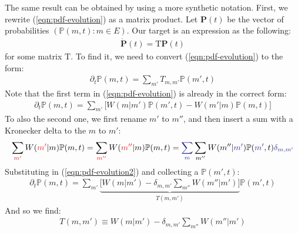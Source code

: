 \documentclass[../../main.tex]{subfiles}
\begin{document}
\medskip

The same result can be obtained by using a more synthetic notation. First, we rewrite (\ref{eqn:pdf-evolution}) as a matrix product. Let $\bm{P}(t)$ be the vector of probabilities $(\mathbb{P}(m,t)\colon m \in E)$. Our target is an expression as the following:
\begin{align}\label{eqn:pdf-evolution-matrixform}
    \dot{\bm{P}}(t) = \mathrm{T} \bm{P}(t)
\end{align}
for some matrix $\mathrm{T}$. To find it, we need to convert (\ref{eqn:pdf-evolution}) to the form:
\begin{align*}
    \partial_t \mathbb{P}(m,t) = \sum_{m'} T_{m,m'} \mathbb{P}(m',t)
\end{align*}
Note that the first term in (\ref{eqn:pdf-evolution}) is already in the correct form:
\begin{align}\label{eqn:pdf-evolution2}
    \partial_t \mathbb{P}(m,t) = \sum_{m'} \Big[W(m|m') \mathbb{P}(m',t) - W(m'|m)\mathbb{P}(m,t)\Big]
\end{align}
To  also the second one, we first rename $m'$ to $m''$, and then insert a sum with a Kronecker delta to  the $m$ to $m'$:
\begin{align*}
    \sum_{\textcolor{Red}{m'}} W(\textcolor{Red}{m'}|m) \mathbb{P}(m,t) = \sum_{\textcolor{Red}{m''}} W(\textcolor{Red}{m''}|m) \mathbb{P}(m,t) = \textcolor{Blue}{\sum_{m}} \sum_{m''} W(m''|\textcolor{Blue}{m'}) \mathbb{P}(\textcolor{Blue}{m'},t) \textcolor{Blue}{\delta_{m,m'}}
\end{align*}
Substituting in (\ref{eqn:pdf-evolution2}) and collecting a $\mathbb{P}(m',t)$:
\begin{align}\label{eqn:evo-matrix}
    \partial_t \mathbb{P}(m,t) = \sum_{m'} \underbrace{\Big[W(m|m') - \delta_{m,m'} \sum_{m''} W(m''|m') \Big]}_{T(m,m')}  \mathbb{P}(m',t)
\end{align}
And so we find:
\begin{align} \label{eqn:T-matrix}
    T(m,m') \equiv W(m|m') - \delta_{m,m'} \sum_{m''} W(m''|m')
\end{align}
\end{document}
